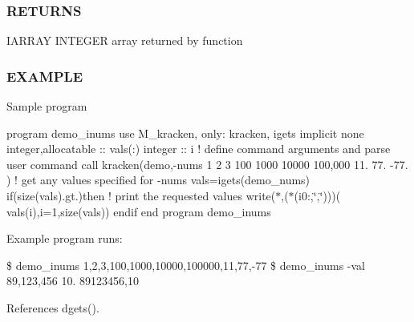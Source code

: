 \subsubsection*{R\+E\+T\+U\+R\+NS}

I\+A\+R\+R\+AY I\+N\+T\+E\+G\+ER array returned by function

\subsubsection*{E\+X\+A\+M\+P\+LE}

Sample program

program demo\+\_\+inums use M\+\_\+kracken, only\+: kracken, igets implicit none integer,allocatable \+:\+: vals(\+:) integer \+:\+: i ! define command arguments and parse user command call kracken(\textquotesingle{}demo\textquotesingle{},\textquotesingle{}-\/nums 1 2 3 100 1000 10000 100,000 11. 77. -\/77.\textquotesingle{} ) ! get any values specified for -\/nums vals=igets(\textquotesingle{}demo\+\_\+nums\textquotesingle{}) if(size(vals).gt.)then ! print the requested values write($\ast$,\textquotesingle{}($\ast$(i0\+:,\char`\"{},\char`\"{}))\textquotesingle{})( vals(i),i=1,size(vals)) endif end program demo\+\_\+inums

Example program runs\+:

\$ demo\+\_\+inums 1,2,3,100,1000,10000,100000,11,77,-\/77 \$ demo\+\_\+inums -\/val 89,123,456 10. 89123456,10 

References dgets().

